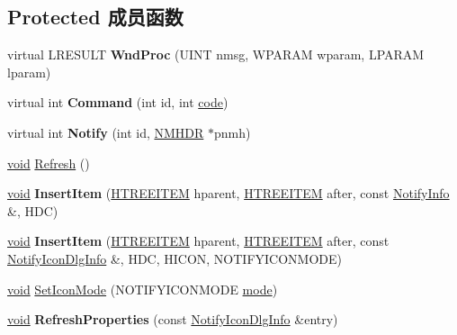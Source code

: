 \subsection*{Protected 成员函数}
\begin{DoxyCompactItemize}
\item 
\mbox{\label{struct_tray_notify_dlg_abed68583fc634df8515f92c2d61df7d2}} 
virtual L\+R\+E\+S\+U\+LT {\bfseries Wnd\+Proc} (U\+I\+NT nmsg, W\+P\+A\+R\+AM wparam, L\+P\+A\+R\+AM lparam)
\item 
\mbox{\label{struct_tray_notify_dlg_ae126b966f1ca2a4268175401ca1866c2}} 
virtual int {\bfseries Command} (int id, int \hyperlink{structcode}{code})
\item 
\mbox{\label{struct_tray_notify_dlg_a066688be8868a6d84db91c3fd5d8f737}} 
virtual int {\bfseries Notify} (int id, \hyperlink{structtag_n_m_h_d_r}{N\+M\+H\+DR} $\ast$pnmh)
\item 
\hyperlink{interfacevoid}{void} \hyperlink{struct_tray_notify_dlg_a8e27d7865edb16d7bbecff7534116899}{Refresh} ()
\item 
\mbox{\label{struct_tray_notify_dlg_af5eb0ba78eda39056ff592250a036d50}} 
\hyperlink{interfacevoid}{void} {\bfseries Insert\+Item} (\hyperlink{struct___t_r_e_e_i_t_e_m}{H\+T\+R\+E\+E\+I\+T\+EM} hparent, \hyperlink{struct___t_r_e_e_i_t_e_m}{H\+T\+R\+E\+E\+I\+T\+EM} after, const \hyperlink{struct_notify_info}{Notify\+Info} \&, H\+DC)
\item 
\mbox{\label{struct_tray_notify_dlg_abb86bc8fcfbdca7f413fca03c738e47f}} 
\hyperlink{interfacevoid}{void} {\bfseries Insert\+Item} (\hyperlink{struct___t_r_e_e_i_t_e_m}{H\+T\+R\+E\+E\+I\+T\+EM} hparent, \hyperlink{struct___t_r_e_e_i_t_e_m}{H\+T\+R\+E\+E\+I\+T\+EM} after, const \hyperlink{struct_notify_icon_dlg_info}{Notify\+Icon\+Dlg\+Info} \&, H\+DC, H\+I\+C\+ON, N\+O\+T\+I\+F\+Y\+I\+C\+O\+N\+M\+O\+DE)
\item 
\hyperlink{interfacevoid}{void} \hyperlink{struct_tray_notify_dlg_a001841ee0119a56a1f009a3694109ea5}{Set\+Icon\+Mode} (N\+O\+T\+I\+F\+Y\+I\+C\+O\+N\+M\+O\+DE \hyperlink{interfacevoid}{mode})
\item 
\mbox{\label{struct_tray_notify_dlg_a2e754300d55747e1d00b208dfba05dfd}} 
\hyperlink{interfacevoid}{void} {\bfseries Refresh\+Properties} (const \hyperlink{struct_notify_icon_dlg_info}{Notify\+Icon\+Dlg\+Info} \&entry)
\end{DoxyCompactItemize}
